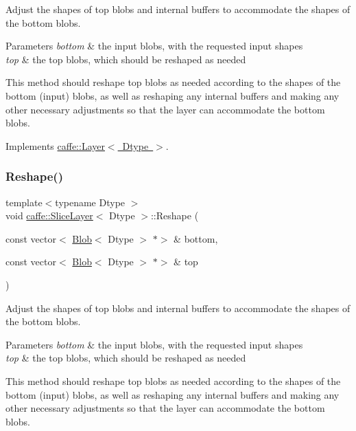 Adjust the shapes of top blobs and internal buffers to accommodate the shapes of the bottom blobs. 


\begin{DoxyParams}{Parameters}
{\em bottom} & the input blobs, with the requested input shapes \\
\hline
{\em top} & the top blobs, which should be reshaped as needed\\
\hline
\end{DoxyParams}
This method should reshape top blobs as needed according to the shapes of the bottom (input) blobs, as well as reshaping any internal buffers and making any other necessary adjustments so that the layer can accommodate the bottom blobs. 

Implements \mbox{\hyperlink{classcaffe_1_1_layer_a7fe981e8af8d93d587acf2a952be563d}{caffe\+::\+Layer$<$ Dtype $>$}}.

\mbox{\label{classcaffe_1_1_slice_layer_af9fa49d54abf1cb090cfc772eb4acc4d}} 
\subsubsection{\texorpdfstring{Reshape()}{Reshape()}\hspace{0.1cm}{\footnotesize\ttfamily [2/2]}}
{\footnotesize\ttfamily template$<$typename Dtype $>$ \\
void \mbox{\hyperlink{classcaffe_1_1_slice_layer}{caffe\+::\+Slice\+Layer}}$<$ Dtype $>$\+::Reshape (\begin{DoxyParamCaption}\item[{const vector$<$ \mbox{\hyperlink{classcaffe_1_1_blob}{Blob}}$<$ Dtype $>$ $\ast$$>$ \&}]{bottom,  }\item[{const vector$<$ \mbox{\hyperlink{classcaffe_1_1_blob}{Blob}}$<$ Dtype $>$ $\ast$$>$ \&}]{top }\end{DoxyParamCaption})\hspace{0.3cm}{\ttfamily [virtual]}}



Adjust the shapes of top blobs and internal buffers to accommodate the shapes of the bottom blobs. 


\begin{DoxyParams}{Parameters}
{\em bottom} & the input blobs, with the requested input shapes \\
\hline
{\em top} & the top blobs, which should be reshaped as needed\\
\hline
\end{DoxyParams}
This method should reshape top blobs as needed according to the shapes of the bottom (input) blobs, as well as reshaping any internal buffers and making any other necessary adjustments so that the layer can accommodate the bottom blobs. 

